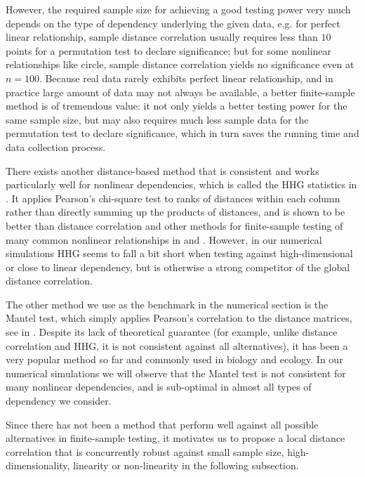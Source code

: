 \documentclass[12pt]{article}
\begin{document}
However, the required sample size for achieving a good testing power very much depends on the type of dependency underlying the given data, e.g. for perfect linear relationship, sample distance correlation usually requires less than $10$ points for a permutation test to declare significance; but for some nonlinear relationships like circle, sample distance correlation yields no significance even at $n=100$. Because real data rarely exhibits perfect linear relationship, and in practice large amount of data may not always be available, a better finite-sample method is of tremendous value: it not only yields a better testing power for the same sample size, but may also requires much less sample data for the permutation test to declare significance, which in turn saves the running time and data collection process. 

There exists another distance-based method that is consistent and works particularly well for nonlinear dependencies, which is called the HHG statistics in \cite{HellerGorfine2013}. It applies Pearson's chi-square test to ranks of distances within each column rather than directly summing up the products of distances, and is shown to be better than distance correlation and other methods for finite-sample testing of many common nonlinear relationships in \cite{GorfineHellerHeller2012} and \cite{HellerGorfine2013}. However, in our numerical simulations HHG seems to fall a bit short when testing against high-dimensional or close to linear dependency, but is otherwise a strong competitor of the global distance correlation. 

The other method we use as the benchmark in the numerical section is the Mantel test, which simply applies Pearson's correlation to the distance matrices, see in \cite{Mantel1967}. Despite its lack of theoretical guarantee (for example, unlike distance correlation and HHG, it is not consistent against all alternatives), it has been a very popular method so far and commonly used in biology and ecology. In our numerical simulations we will observe that the Mantel test is not consistent for many nonlinear dependencies, and is sub-optimal in almost all types of dependency we consider.

Since there has not been a method that perform well against all possible alternatives in finite-sample testing, it motivates us to propose a local distance correlation that is concurrently robust against small sample size, high-dimensionality, linearity or non-linearity in the following subsection.
\end{document}
